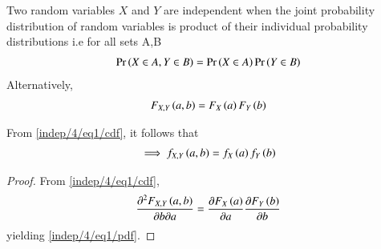 
\begin{definition}
    Two random variables $X$ and $Y$ are independent when the joint probability distribution of random variables is product of their individual probability distributions i.e for all sets A,B
    \begin{align}
        \label{indep/4/eq1} \Pr\left(X\in A,Y \in B\right)=\Pr\left(X \in A\right)\Pr\left(Y \in B\right)
    \end{align}
    Alternatively, 
    \begin{align}
        \label{indep/4/eq1/cdf} F_{X,Y}\left(a,b\right)=F_X\left(a\right)F_Y\left(b\right)
     \end{align}
  
\end{definition}
\begin{lemma}
From \eqref{indep/4/eq1/cdf}, it follows that 
\begin{align}
    \implies f_{X,Y}\left(a,b\right)=f_X\left(a\right)f_Y\left(b\right)
    \label{indep/4/eq1/pdf}
\end{align}
\end{lemma}
\begin{proof}
    From \eqref{indep/4/eq1/cdf},
    \begin{align}
        \frac{\partial^2 F_{X,Y}\left(a,b\right)}{\partial b \partial a}=\frac{\partial F_X\left(a\right) }{\partial a}\frac{\partial F_Y\left(b\right) }{\partial b} 
    \end{align}
    yielding     \eqref{indep/4/eq1/pdf}.
\end{proof}


